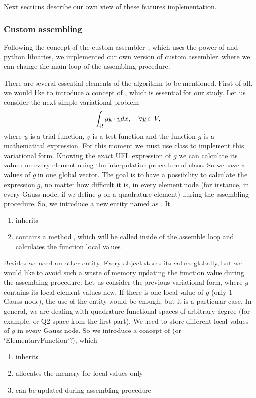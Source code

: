 \documentclass[12pt]{article}
\begin{document}
Next sections describe our own view of these features implementation.

\subsubsection{Custom assembling}

Following the concept of the custom assembler~\parencite{test_custom_assembler}, which uses the power of  and  python libraries, we implemented our own version of custom assembler, where we can change the main loop of the assembling procedure.

There are several essential elements of the algorithm to be mentioned. First of all, we would like to introduce a concept of , which is essential for our study. Let us consider the next simple variational problem 
$$ \int_\Omega g \underline{u} \cdot \underline{v} dx, \quad \forall \underline{v} \in V, $$
where $\underline{u}$ is a trial function, $\underline{v}$ is a test function and the function $g$ is a mathematical expression. For this moment we must use  class to implement this variational form. Knowing the exact UFL expression of $g$ we can calculate its values on every element using the interpolation procedure of  class. So we save all values of $g$ in one global vector. The goal is to have a possibility to calculate the expression $g$, no matter how difficult it is, in every element node (for instance, in every Gauss node, if we define $g$ on a quadrature element) during the assembling procedure. So, we introduce a new entity named as . It
\begin{enumerate}
    \item inherits 
    \item contains a method , which will be called inside of the assemble loop and calculates the function local values
\end{enumerate}

Besides  we need an other entity. Every  object stores its values globally, but we would like to avoid such a waste of memory updating the function value during the assembling procedure. Let us consider the previous variational form, where $g$ contains its local-element values now. If there is one local value of $g$ (only 1 Gauss node), the use of the  entity would be enough, but it is a particular case. In general, we are dealing with quadrature functional spaces of arbitrary degree (for example,  or Q2 space from the first part). We need to store different local values of $g$ in every Gauss node. So we introduce a concept of  (or `ElementaryFunction`?), which 
\begin{enumerate}
    \item inherits 
    \item allocates the memory for local values only
    \item can be updated during assembling procedure
\end{enumerate}
\end{document}

